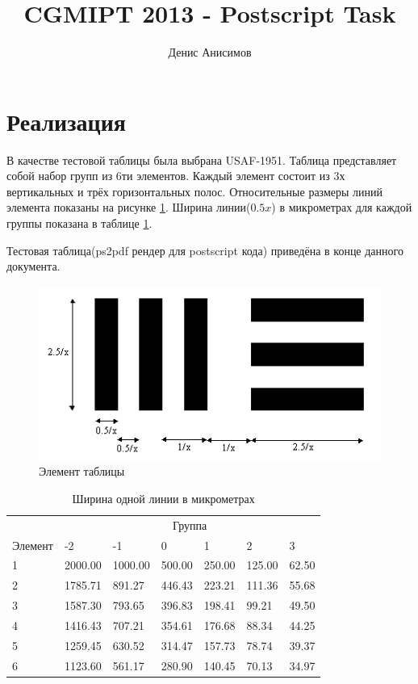 \documentclass[11pt]{article}
\title{CGMIPT 2013 - Postscript Task}
\author{Денис Анисимов}
\begin{document}
\maketitle
\section*{Реализация}
В качестве тестовой таблицы была выбрана USAF-1951. Таблица представляет собой набор групп из 6ти элементов. Каждый элемент состоит из 3х вертикальных и трёх горизонтальных полос. Относительные размеры линий элемента показаны на рисунке \ref{fig:elem}. Ширина линии($0.5x$) в микрометрах для каждой группы показана в таблице \ref{tab:width}. 

Тестовая таблица(ps2pdf рендер для postscript кода) приведёна в конце данного документа.
\begin{figure}[!h]
  \begin{center}
  \includegraphics[scale=0.5]{USAFTestElementSpec.png}  
  \caption[Элемент таблицы]{Элемент таблицы\protect\footnotemark}
  \label{fig:elem}
  \end{center}
\end{figure}

\begin{table}[!h]
\begin{center}
\begin{tabular}{lllllll}
& \multicolumn{6}{c}{Группа}\\
Элемент & -2 & -1 & 0  & 1 & 2 & 3 
\\
1 & 2000.00& 1000.00& 500.00 & 250.00 & 125.00 & 62.50
\\
2 & 1785.71& 891.27 & 446.43 & 223.21 & 111.36 & 55.68
\\
3 & 1587.30& 793.65 & 396.83 & 198.41 & 99.21 & 49.50
\\
4 & 1416.43& 707.21 & 354.61 & 176.68 & 88.34 & 44.25
\\
5 & 1259.45& 630.52 & 314.47 & 157.73 & 78.74 & 39.37
\\
6 & 1123.60& 561.17 & 280.90 & 140.45 & 70.13 & 34.97
\end{tabular}
\caption{Ширина одной линии в микрометрах}
\label{tab:width}
\end{center}
\end{table}
\end{document}
